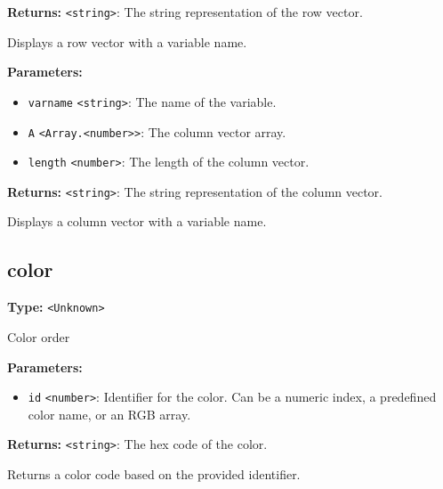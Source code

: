 \documentclass[12pt,a4paper]{article}
\begin{document}
\noindent \textbf{Returns:} \texttt{<string>}: The string representation of the row vector.

\noindent Displays a row vector with a variable name.

\vspace{5mm}
\noindent {}


\noindent \textbf{Parameters:}
\begin{itemize}
  \item \texttt{varname} \texttt{<string>}: The name of the variable.
  \item \texttt{A} \texttt{<Array.<number>>}: The column vector array.
  \item \texttt{length} \texttt{<number>}: The length of the column vector.
\end{itemize}

\noindent \textbf{Returns:} \texttt{<string>}: The string representation of the column vector.

\noindent Displays a column vector with a variable name.


\subsection{color}
\vspace{5mm}
\noindent {}\vspace{4mm}


\noindent \textbf{Type:} \texttt{<Unknown>}

\noindent Color order

\vspace{5mm}
\noindent {}


\noindent \textbf{Parameters:}
\begin{itemize}
  \item \texttt{id} \texttt{<number>}: Identifier for the color. Can be a numeric index, a predefined color name, or an RGB array.
\end{itemize}

\noindent \textbf{Returns:} \texttt{<string>}: The hex code of the color.

\noindent Returns a color code based on the provided identifier.
\end{document}
